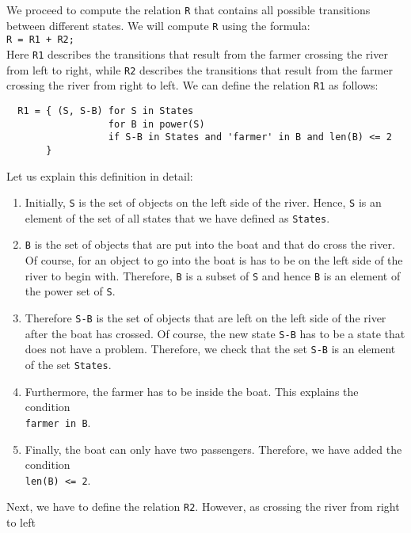 We proceed to compute the relation \texttt{R} that contains all possible transitions between
different states.  We will compute \texttt{R} using the formula:
\\[0.2cm]
\hspace*{0.75cm}
\texttt{R = R1 + R2;}
\\[0.2cm]
Here \texttt{R1} describes the transitions that result from the farmer crossing the river from left
to right, while \texttt{R2} describes the transitions that result from the farmer crossing the river
from right to left.  We can define the relation \texttt{R1} as follows:
\begin{verbatim}
  R1 = { (S, S-B) for S in States 
                  for B in power(S)
                  if S-B in States and 'farmer' in B and len(B) <= 2
       }
\end{verbatim}
Let us explain this definition in detail:
\begin{enumerate}
\item Initially, \texttt{S} is the set of objects on the left side of the river.  Hence, \texttt{S}
      is an element of the set of all states that we have defined as \texttt{States}.
\item \texttt{B} is the set of objects that are put into the boat and that do cross the river.  Of
      course, for an object to go into the boat is has to be on the left side of the river to begin
      with.  Therefore, \texttt{B} is a subset of \texttt{S} and hence \texttt{B} is an element of the power set
      of \texttt{S}. 
\item Therefore  \texttt{S-B} is the set of objects that are left on the left side of the river after
      the boat has crossed.  Of course, the new state \texttt{S-B} has to be a state that does not
      have a problem.  Therefore, we check that the set \texttt{S-B} is an element of the set \texttt{States}.
\item Furthermore, the farmer has to be inside the boat.  This explains the condition 
      \\[0.2cm]
      \hspace*{1.3cm}
      \texttt{farmer in B}.
\item Finally, the boat can only have two passengers.  Therefore, we have added the condition
      \\[0.2cm]
      \hspace*{1.3cm}
      \texttt{len(B) <= 2}.
\end{enumerate}
Next, we have to define the relation \texttt{R2}.  However, as crossing the river from right to left
